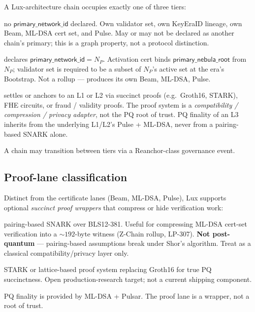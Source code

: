\begin{definition}
\label{def:network-tiers}
A Lux-architecture chain occupies exactly one of three tiers:
\begin{description}[nosep,leftmargin=2em]
  \item[L1 (sovereign):] no $\mathsf{primary\_network\_id}$ declared.
        Own validator set, own KeyEraID lineage, own Beam, ML-DSA cert
        set, and Pulse. May or may not be declared as another chain's
        primary; this is a graph property, not a protocol distinction.
  \item[L2 (co-validating):] declares
        $\mathsf{primary\_network\_id} = N_P$.
        Activation cert binds $\mathsf{primary\_nebula\_root}$
        from $N_P$; validator set is required to be a subset of $N_P$'s
        active set at the era's Bootstrap. Not a rollup — produces its
        own Beam, ML-DSA, Pulse.
  \item[L3 (rollup / validity / app-execution):] settles or anchors to
        an L1 or L2 via succinct proofs (e.g.\ Groth16, STARK), FHE
        circuits, or fraud / validity proofs. The proof system is a
        \emph{compatibility / compression / privacy adapter}, not the PQ
        root of trust. PQ finality of an L3 inherits from the
        underlying L1/L2's Pulse + ML-DSA, never from a pairing-based
        SNARK alone.
\end{description}
A chain may transition between tiers via a Reanchor-class governance
event.
\end{definition}

\subsection*{Proof-lane classification}

\begin{definition}
\label{def:proof-lane}
Distinct from the certificate lanes (Beam, ML-DSA, Pulse), Lux supports
optional \emph{succinct proof wrappers} that compress or hide
verification work:
\begin{description}[nosep,leftmargin=2em]
  \item[Groth16 wrapper (classical):] pairing-based SNARK over BLS12-381.
        Useful for compressing ML-DSA cert-set verification into a
        $\sim 192$-byte witness (Z-Chain rollup, LP-307). \textbf{Not
        post-quantum} — pairing-based assumptions break under Shor's
        algorithm. Treat as a classical compatibility/privacy layer
        only.
  \item[Future PQ-friendly wrapper:] STARK or lattice-based proof
        system replacing Groth16 for true PQ succinctness. Open
        production-research target; not a current shipping component.
\end{description}
PQ finality is provided by ML-DSA + Pulsar. The proof lane is a
wrapper, not a root of trust.
\end{definition}

